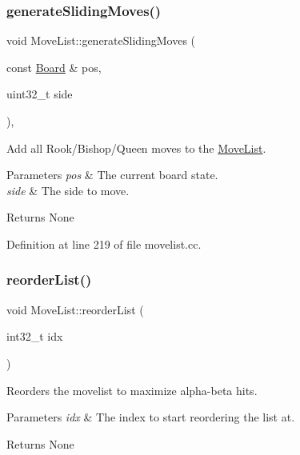 \subsubsection{\texorpdfstring{generate\+Sliding\+Moves()}{generateSlidingMoves()}}
{\footnotesize\ttfamily void Move\+List\+::generate\+Sliding\+Moves (\begin{DoxyParamCaption}\item[{const \mbox{\hyperlink{classBoard}{Board}} \&}]{pos,  }\item[{uint32\+\_\+t}]{side }\end{DoxyParamCaption})\hspace{0.3cm}{\ttfamily [private]}, {\ttfamily [noexcept]}}



Add all Rook/\+Bishop/\+Queen moves to the \mbox{\hyperlink{classMoveList}{Move\+List}}. 


\begin{DoxyParams}{Parameters}
{\em pos} & The current board state. \\
\hline
{\em side} & The side to move. \\
\hline
\end{DoxyParams}
\begin{DoxyReturn}{Returns}
None 
\end{DoxyReturn}


Definition at line 219 of file movelist.\+cc.

\mbox{\label{classMoveList_a24fbd4061fa4ffb33cdb1ab4a5a2001a}} 
\subsubsection{\texorpdfstring{reorder\+List()}{reorderList()}}
{\footnotesize\ttfamily void Move\+List\+::reorder\+List (\begin{DoxyParamCaption}\item[{int32\+\_\+t}]{idx }\end{DoxyParamCaption})\hspace{0.3cm}{\ttfamily [noexcept]}}



Reorders the movelist to maximize alpha-\/beta hits. 


\begin{DoxyParams}{Parameters}
{\em idx} & The index to start reordering the list at. \\
\hline
\end{DoxyParams}
\begin{DoxyReturn}{Returns}
None 
\end{DoxyReturn}


